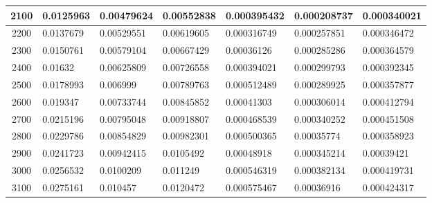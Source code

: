 \documentclass[11pt,spanish]{article} %
\begin{document}
\begin{center}
\begin{longtable}{|c|l|l|l|l|l|l|}
2100 & 0.0125963                    & 0.00479624                     & 0.00552838                     & 0.000395432                    & 0.000208737                    & 0.000340021                   \\ \hline
2200 & 0.0137679                    & 0.00529551                     & 0.00619605                     & 0.000316749                    & 0.000257851                    & 0.000346472                   \\ \hline
2300 & 0.0150761                    & 0.00579104                     & 0.00667429                     & 0.00036126                     & 0.000285286                    & 0.000364579                   \\ \hline
2400 & 0.01632                      & 0.00625809                     & 0.00726558                     & 0.000394021                    & 0.000299793                    & 0.000392345                   \\ \hline
2500 & 0.0178993                    & 0.006999                       & 0.00789763                     & 0.000512489                    & 0.000289925                    & 0.000357877                   \\ \hline
2600 & 0.019347                     & 0.00733744                     & 0.00845852                     & 0.00041303                     & 0.000306014                    & 0.000412794                   \\ \hline
2700 & 0.0215196                    & 0.00795048                     & 0.00918807                     & 0.000468539                    & 0.000340252                    & 0.000451508                   \\ \hline
2800 & 0.0229786                    & 0.00854829                     & 0.00982301                     & 0.000500365                    & 0.00035774                     & 0.000358923                   \\ \hline
2900 & 0.0241723                    & 0.00942415                     & 0.0105492                      & 0.00048918                     & 0.000345214                    & 0.00039421                    \\ \hline
3000 & 0.0256532                    & 0.0100209                      & 0.011249                       & 0.000546319                    & 0.000382134                    & 0.000419731                   \\ \hline
3100 & 0.0275161                    & 0.010457                       & 0.0120472                      & 0.000575467                    & 0.00036916                     & 0.000424317                   \\ \hline

\end{longtable}
\end{center}
\end{document}

